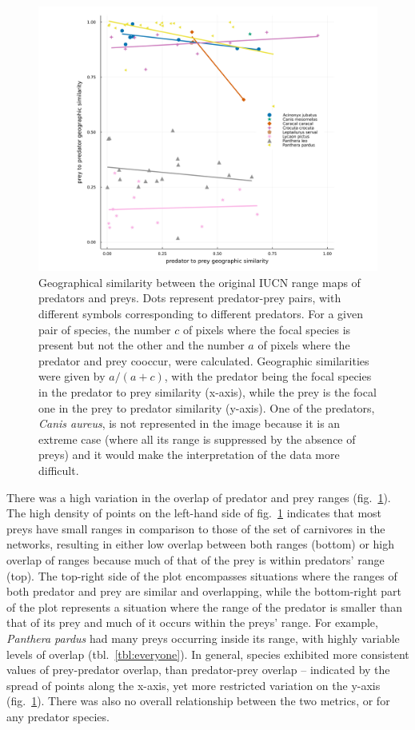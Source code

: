 \documentclass[10pt,oneside]{article}
\makeatletter
\def\maxwidth{\ifdim\Gin@nat@width>\linewidth\linewidth
\else\Gin@nat@width\fi}
\let\Oldincludegraphics\includegraphics
\renewcommand{\includegraphics}[1]{\Oldincludegraphics[width=\maxwidth]{#1}}
\makeatother
\begin{document}
\begin{figure}
\hypertarget{fig:geo_diss}{%
\centering
\includegraphics{figures/beta-div_pred-species.png}
\caption{Geographical similarity between the original IUCN range maps of
predators and preys. Dots represent predator-prey pairs, with different
symbols corresponding to different predators. For a given pair of
species, the number \(c\) of pixels where the focal species is present
but not the other and the number \(a\) of pixels where the predator and
prey cooccur, were calculated. Geographic similarities were given by
\(a/(a+c)\), with the predator being the focal species in the predator
to prey similarity (x-axis), while the prey is the focal one in the prey
to predator similarity (y-axis). One of the predators, \emph{Canis
aureus}, is not represented in the image because it is an extreme case
(where all its range is suppressed by the absence of preys) and it would
make the interpretation of the data more difficult.}\label{fig:geo_diss}
}
\end{figure}

There was a high variation in the overlap of predator and prey ranges
(fig.~\ref{fig:geo_diss}). The high density of points on the left-hand
side of fig.~\ref{fig:geo_diss} indicates that most preys have small
ranges in comparison to those of the set of carnivores in the networks,
resulting in either low overlap between both ranges (bottom) or high
overlap of ranges because much of that of the prey is within predators'
range (top). The top-right side of the plot encompasses situations where
the ranges of both predator and prey are similar and overlapping, while
the bottom-right part of the plot represents a situation where the range
of the predator is smaller than that of its prey and much of it occurs
within the preys' range. For example, \emph{Panthera pardus} had many
preys occurring inside its range, with highly variable levels of overlap
(tbl.~\ref{tbl:everyone}). In general, species exhibited more consistent
values of prey-predator overlap, than predator-prey overlap -- indicated
by the spread of points along the x-axis, yet more restricted variation
on the y-axis (fig.~\ref{fig:geo_diss}). There was also no overall
relationship between the two metrics, or for any predator species.
\end{document}
